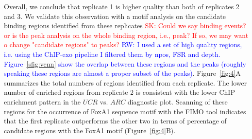 \documentclass{bmcart}
\newcommand{\SK}[1]{\textcolor{red}{SK: #1}}
\newcommand{\RW}[1]{\textcolor{blue}{RW: #1}}
\begin{document}
 Overall, we conclude that replicate 1 is higher quality than both of
 replicates 2 and 3.  We validate this observation with a motif
 analysis on the candidate binding regions identified from these
 replicates \SK{Could we say binding events? or is the peak analysis
   on the whole binding region, i.e., peak? If so, we may want o
   change "candidate regions" to peaks?} \RW{I used a set of high
   quality regions, i.e. using the ChIP-exo pipeline I filtered them
   by npos, FSR and depth. Figure~\ref{sfig:venn} show the overlap
   between these regions and the peaks (roughly speaking these regions
   are almost a proper subset of the peaks)}. Figure~\ref{fig:4}A
 summarizes the total numbers of regions identified from each
 replicate. The lower number of enriched regions from replicate 2 is
 consistent with the lower ChIP enrichment pattern in the $UCR$
 vs. $ARC$ diagnostic plot.  Scanning of these regions for the
 occurrence of FoxA1 sequence motif with the FIMO tool \cite{fimo}
 indicates that the first replicate outperforms the other two in terms
 of percentage of candidate regions with the FoxA1 motif
 (Figure~\ref{fig:4}B).
\end{document}
